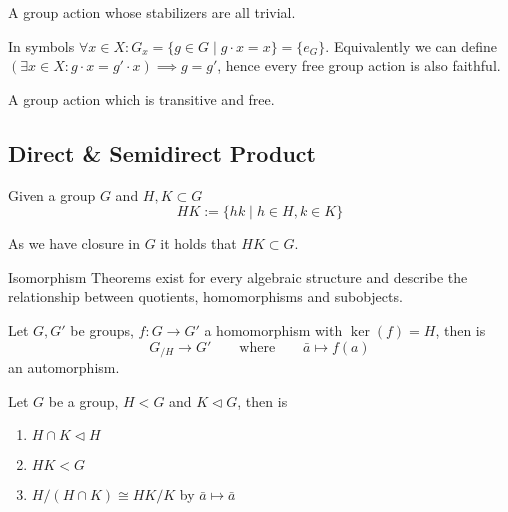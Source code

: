 \begin{definition}
   A group action whose stabilizers are all trivial.
\end{definition}
\begin{remark}
   In symbols \(\forall x \in X: G_x = \{g \in G \mid g\cdot x = x\} = \{e_G\}\).
   Equivalently we can define \((\exists x \in X: g \cdot x = g' \cdot x) \implies g = g'\), hence every free group action is also faithful.
\end{remark}

\begin{definition}
   A group action which is transitive and free.
\end{definition}

\subsection{Direct \& Semidirect Product}
\begin{definition}
   Given a group \(G\) and \(H, K \subset G\)
   \[HK := \{hk \mid h \in H, k \in K\}\]
\end{definition}
\begin{remark}
   As we have closure in \(G\) it holds that \(HK \subset G\).
\end{remark}

Isomorphism Theorems exist for every algebraic structure and describe the relationship between quotients, homomorphisms and subobjects.
\begin{proposition}
   Let \(G, G'\) be groups, \(f: G \to G'\) a homomorphism with \(\ker(f) = H\), then is
   \[G_{/H} \to G' \qquad\text{where}\qquad \bar{a} \mapsto f(a)\]
   an automorphism.
\end{proposition}

\begin{proposition}
   Let \(G\) be a group, \(H < G\) and \(K \triangleleft G\), then is
   \begin{enumerate}[label=\roman*, align=Center]
      \item \(H \cap K \triangleleft H\)
      \item \(HK < G\)
      \item \(H/(H \cap K) \cong HK/K\) by \(\bar{a} \mapsto \bar{a}\)
   \end{enumerate}
\end{proposition}

